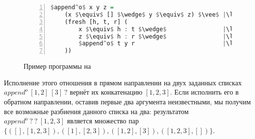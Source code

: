 \begin{figure}[h!]
  \begin{center}
  \begin{minipage}{0.4\textwidth}
  \begin{lstlisting}[language=Haskell, frame=single, numbers=left,numberstyle=\small, escapechar=|]
  $append^o$ x y z =
    (x $\equiv$ [] $\wedge$ y $\equiv$ z) $\vee$ |\label{line:appendo2}|
    (fresh [h, t, r] (
        x $\equiv$ h : t $\wedge$                |\label{line:appendo4}|
        z $\equiv$ h : r $\wedge$                |\label{line:appendo5}|
        $append^o$ t y r                         |\label{line:appendo6}|
    ))
    \end{lstlisting}
  \end{minipage}
  \end{center}
  \caption{Пример программы на \miniKanren{}}
  \label{lst:appendo}
\end{figure}

Исполнение этого отношения в прямом направлении на двух заданных списках $append^o \ [1,2] \ [3] \ ?$ вернёт их конкатенацию $[1,2,3]$.
Если исполнить его в обратном направлении, оставив первые два аргумента неизвестными, мы получим все возможные разбиения данного списка на два: результатом $append^o \ ? \ ? \ [1,2,3]$ является множество пар $\{([],[1,2,3]), ([1], [2,3]), ([1,2], [3]), ([1,2,3], [])\}$.